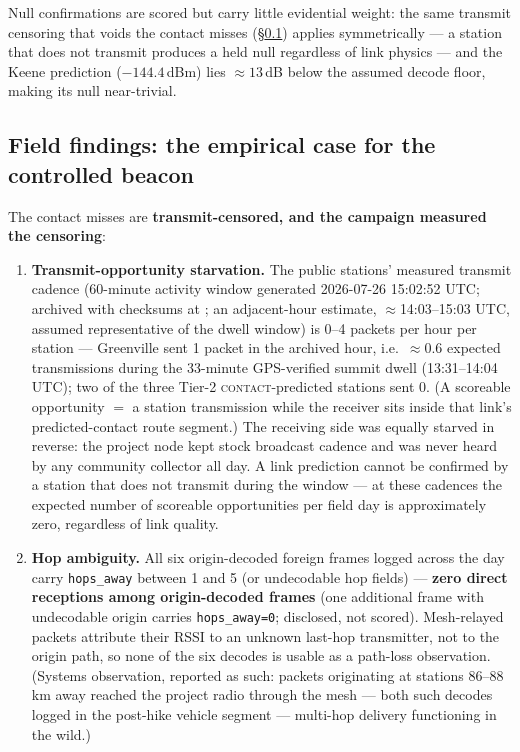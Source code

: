 \documentclass[11pt]{article}
\newcommand{\code}[1]{\texttt{\small #1}}
\begin{document}
Null confirmations are scored but carry little evidential weight: the same
transmit censoring that voids the contact misses (\S\ref{sec:fieldfindings})
applies symmetrically --- a station that does not transmit produces a held
null regardless of link physics --- and the Keene prediction ($-144.4$\,dBm)
lies ${\approx}13$\,dB below the assumed decode floor, making its null
near-trivial.

\subsection{Field findings: the empirical case for the controlled beacon}\label{sec:fieldfindings}

The contact misses are \textbf{transmit-censored, and the campaign measured
the censoring}:

\begin{enumerate}
\item \textbf{Transmit-opportunity starvation.} The public stations' measured transmit cadence (60-minute activity window generated 2026-07-26 15:02:52 UTC; archived with checksums at ; an adjacent-hour estimate, ${\approx}$14:03--15:03 UTC, assumed representative of the dwell window) is 0--4 packets per hour per station --- Greenville sent 1 packet in the archived hour, i.e.\ ${\approx}0.6$ expected transmissions during the 33-minute GPS-verified summit dwell (13:31--14:04 UTC); two of the three Tier-2 \textsc{contact}-predicted stations sent 0. (A scoreable opportunity $=$ a station transmission while the receiver sits inside that link's predicted-contact route segment.) The receiving side was equally starved in reverse: the project node
kept stock broadcast cadence and was never heard by any community collector
all day. A link prediction cannot be confirmed by a station that does not
transmit during the window --- at these cadences the expected number of
scoreable opportunities per field day is approximately zero, regardless of
link quality.
\item \textbf{Hop ambiguity.} All six origin-decoded foreign frames logged across the day carry \code{hops\_away} between 1 and 5 (or undecodable hop fields) --- \textbf{zero direct receptions among origin-decoded frames} (one additional frame with undecodable origin carries \code{hops\_away=0}; disclosed, not scored). Mesh-relayed packets attribute their RSSI to an unknown
last-hop transmitter, not to the origin path, so none of the six decodes is
usable as a path-loss observation. (Systems observation, reported as such:
packets originating at stations 86--88\,km away reached the project radio through the mesh --- both such decodes logged in the post-hike vehicle segment --- multi-hop delivery functioning in the wild.)
\end{enumerate}
\end{document}
